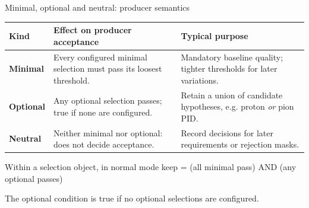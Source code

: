 \begin{frame}{Minimal, optional and neutral: producer semantics}
        \small
        \renewcommand{\arraystretch}{1.35}
        \begin{tabular}{p{}p{}p{}}
                \toprule
                Kind & Effect on producer acceptance & Typical purpose \\
                \midrule
                \textbf{Minimal} & Every configured minimal selection
                must pass its loosest threshold. & Mandatory baseline
                quality; tighter thresholds for later variations.\\
                \textbf{Optional} & Any optional selection passes;
                true if none are configured. & Retain a union of
                candidate hypotheses, e.g. proton \emph{or} pion PID.\\
                \textbf{Neutral} & Neither minimal nor optional: does
                not decide acceptance. & Record decisions for later
                requirements or rejection masks.\\
                \bottomrule
        \end{tabular}
        \begin{block}{Within a selection object, in normal mode}
                \centering
                keep = (all minimal pass) AND (any optional passes)\par
                \small The optional condition is true if no optional
                selections are configured.
        \end{block}
\end{frame}

